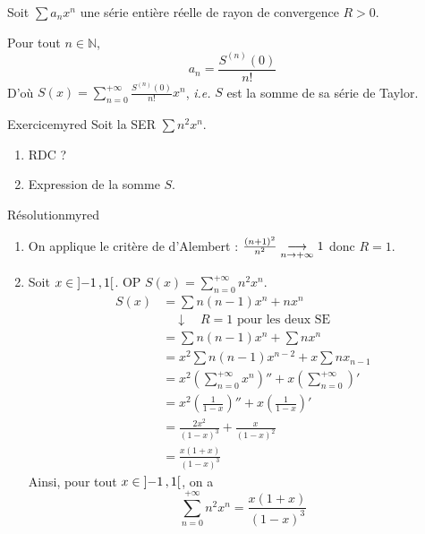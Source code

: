     \begin{coro}{}{}
        Soit $\sum a_n x^n$ une série entière \textcolor{myorange}{réelle} de rayon de convergence $R > 0$. 

        Pour tout $n \in \mathbb{N}$, 
        \[ a_n = \frac{S^{(n)}(0)}{n!} \]   
        D’où $S(x) = \sum_{n=0}^{+\infty} \frac{S^{(n)}(0)}{n!} x^n$, \textit{i.e.} $S$ est la somme de sa série de Taylor.
    \end{coro}

    \begin{omed}{Exercice}{myred}
        Soit la SER $\sum n^2 x^n$.
        \begin{enumerate}
            \item RDC ?
            \item Expression de la somme $S$.
        \end{enumerate}
    \end{omed}

    \begin{demo}{Résolution}{myred}
        \begin{enumerate}
            \item On applique le critère de d’Alembert : $\frac{(n+1)^2}{n^2} \underset{n \rightarrow +\infty}{\longrightarrow} 1$ donc $R = 1$.
            \item Soit $x \in \left] -1 \, , 1 \right[$. OP $S(x) = \sum_{n=0}^{+\infty} n^2 x^n$. 
            \begin{align*}
                S(x) 
                &= \sum n(n-1) x^n + n x^n \\
                &\quad \downarrow \quad R = 1 \text{ pour les deux SE} \\
                &= \sum n(n-1) x^n + \sum n x^n \\
                &= x^2 \sum n(n-1)x^{n-2} + x \sum n x_{n-1} \\
                &= x^2 \left(\sum_{n=0}^{+\infty} x^n\right)''+ x \left(\sum_{n=0}^{+\infty}\right)' \\
                &= x^2 \left(\frac{1}{1-x}\right)'' + x \left(\frac{1}{1-x}\right)' \\
                &= \frac{2 x^2}{(1-x)^3} + \frac{x}{(1-x)^2} \\
                &= \frac{x(1 + x)}{(1-x)^3}
            \end{align*}
            Ainsi, pour tout $x \in \left] -1 \, , 1 \right[$, on a 
            \[ \sum_{n=0}^{+\infty} n^2 x^n = \frac{x(1+x)}{(1-x)^3} \]   
        \end{enumerate}
    \end{demo}

